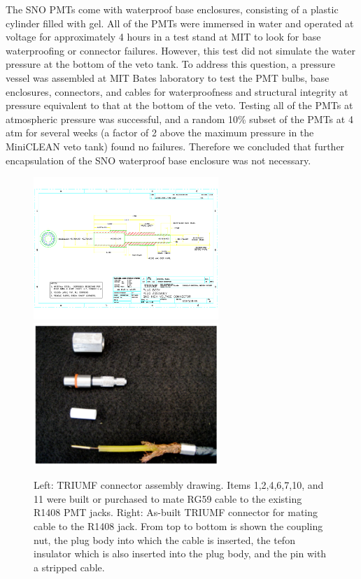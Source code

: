 \documentclass{JINST}
\begin{document}
The SNO PMTs come with waterproof base enclosures, consisting of a
plastic cylinder filled with gel.  All of the PMTs were immersed in water and operated at voltage for approximately 4 hours in a test stand at
MIT to look for base waterproofing or connector failures.  However,
this test did not simulate the water pressure at the bottom of the
veto tank.  To address this question, a pressure vessel was assembled
at MIT Bates laboratory to test the PMT bulbs, base enclosures, connectors, and
cables for waterproofness and structural integrity at pressure
equivalent to that at the bottom of the veto. Testing
all of the PMTs at atmospheric pressure was successful, and a random
10\% subset of the PMTs at 4 atm for several weeks (a factor of 2
above the maximum pressure in the MiniCLEAN veto tank) found no
failures.  Therefore we concluded that further encapsulation of the
SNO waterproof base enclosure was not necessary.

\begin{figure}[ht]
\begin{center}
\includegraphics[width=2.75in,page=13]{graphics/snoConnectorDrawings.pdf}
\includegraphics[width=2.75in]{graphics/connectorpic.pdf}
\caption{Left: TRIUMF connector assembly drawing.  Items 1,2,4,6,7,10, and 11 were built or purchased to mate RG59 cable to the existing R1408 PMT jacks.  Right: As-built TRIUMF connector for mating cable to the R1408 jack.  From top to bottom is shown the coupling nut, the plug body into which the cable is inserted, the tefon insulator which is also inserted into the plug body, and the pin with a stripped cable.
\label{fig:connectordrawing}}
\end{center}
\end{figure}
\end{document}
